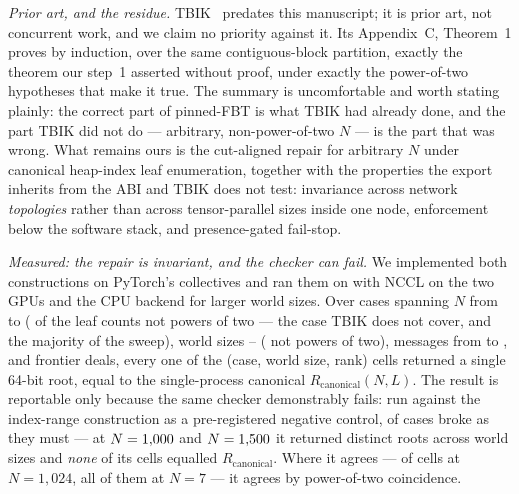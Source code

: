\documentclass[journal,10pt]{IEEEtran}
\theoremstyle{plain}
\theoremstyle{definition}
\theoremstyle{remark}
\newcommand{\Rcan}{\ensuremath{R_{\mathrm{canonical}}}}
\begin{document}
\emph{Prior art, and the residue.} TBIK~\cite{tbik2025} predates this
manuscript; it is prior art, not concurrent work, and we claim no priority
against it. Its Appendix~C, Theorem~1 proves by induction, over the same
contiguous-block partition, exactly the theorem our step~1 asserted without
proof, under exactly the power-of-two hypotheses that make it true. The
summary is uncomfortable and worth stating plainly: the correct part of
pinned-FBT is what TBIK had already done, and the part TBIK did not do ---
arbitrary, non-power-of-two $N$ --- is the part that was wrong. What remains
ours is the cut-aligned repair for arbitrary $N$ under canonical heap-index
leaf enumeration, together with the properties the export inherits from the
ABI and TBIK does not test: invariance across network \emph{topologies} rather
than across tensor-parallel sizes inside one node, enforcement below the
software stack, and presence-gated fail-stop.

\emph{Measured: the repair is invariant, and the checker can fail.} We
implemented both constructions on PyTorch's collectives and ran them on
\GpuHardware{} with NCCL on the two GPUs and the CPU backend for larger world
sizes. Over \PinCases{} cases spanning $N$ from \PinLeafLo{} to \PinLeafHi{}
(\PinNpowLeaf{} of the leaf counts not powers of two --- the case TBIK does
not cover, and the majority of the sweep), world sizes
\PinWorldLo{}--\PinWorldHi{} (\PinNpowWorld{} not powers of two), messages
from \PinMsgLo{} to \PinMsgHi{}, and \PinDeals{} frontier deals, every one of
the \PinCells{} (case, world size, rank) cells returned a single 64-bit root,
equal to the single-process canonical $\Rcan(N,L)$. The result is reportable
only because the same checker demonstrably fails: run against the index-range
construction as a pre-registered negative control, \PinNegFired{} of
\PinNegCases{} cases broke as they must --- at $N=1{,}000{}$ and
$N=1{,}500{}$ it returned \PinNegDistinct{} distinct roots across world
sizes \PinNegWorlds{} and \emph{none} of its \PinNegCells{} cells equalled
$\Rcan$. Where it agrees --- \PinNegPartial{} of \PinNegCells{} cells at
$N=1{,}024$, all of them at $N=7$ --- it agrees by power-of-two coincidence.
\end{document}
